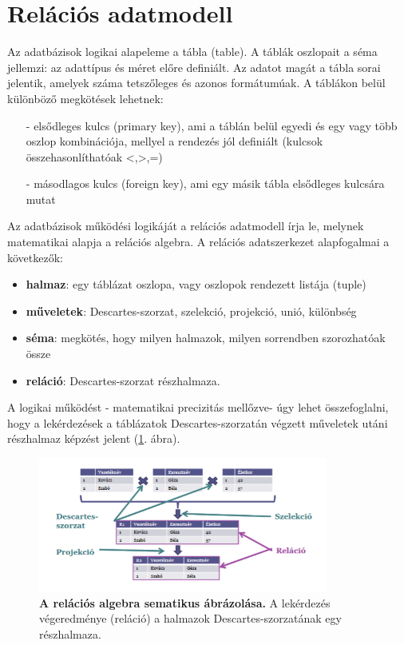 \documentclass[12pt]{article}
\theoremstyle{plain}
\begin{document}
\section{Relációs adatmodell}

Az adatbázisok logikai alapeleme a tábla (table). A táblák oszlopait a séma jellemzi: az adattípus és méret előre definiált. Az adatot magát a tábla sorai jelentik, amelyek száma tetszőleges és azonos formátumúak. A táblákon belül különböző megkötések lehetnek: 
\begin{itemize}
    \item[-]elsődleges kulcs (primary key), ami a táblán belül egyedi és egy vagy több oszlop kombinációja, mellyel a rendezés jól definiált (kulcsok összehasonlíthatóak <,>,=) 
    \item[-]másodlagos kulcs (foreign key), ami egy másik tábla elsődleges kulcsára mutat
\end{itemize}{}
Az adatbázisok működési logikáját a relációs adatmodell írja le, melynek matematikai alapja a relációs algebra. A relációs adatszerkezet alapfogalmai a következők:
\begin{itemize}
    \item \textbf{halmaz}: egy táblázat oszlopa, vagy oszlopok rendezett listája (tuple)
    \item \textbf{műveletek}: Descartes-szorzat, szelekció, projekció, unió, különbség
    \item \textbf{séma}: megkötés, hogy milyen halmazok, milyen sorrendben szorozhatóak össze
    \item \textbf{reláció}: Descartes-szorzat részhalmaza.
\end{itemize}{}
A logikai működést - matematikai precizitás mellőzve- úgy lehet összefoglalni, hogy a lekérdezések a táblázatok Descartes-szorzatán végzett műveletek utáni részhalmaz képzést jelent (\ref{fig:rel}. ábra).


\begin{figure}[H]
    \begin{center}
    \includegraphics[width=0.85\textwidth]{media/rel.png}
    \caption{\textbf{A relációs algebra sematikus ábrázolása.} A lekérdezés végeredménye (reláció) a halmazok Descartes-szorzatának egy részhalmaza.} 
    \label{fig:rel}
    \end{center}
\end{figure}
\end{document}

